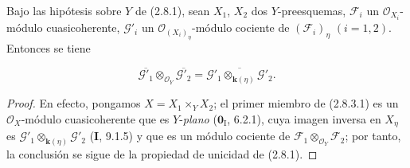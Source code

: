 \begin{proposition}[2.8.4]
\label{IV.2.8.4-fr}
Bajo las hipótesis sobre $Y$ de \textup{(2.8.1)}, sean $X_1$, $X_2$ dos
$Y$-preesquemas, $\mathcal F_i$ un $\mathcal O_{X_i}$-módulo
cuasicoherente, $\mathcal G'_i$ un $\mathcal O_{(X_i)_\eta}$-módulo cociente
de $(\mathcal F_i)_\eta$ $(i=1,2)$. Entonces se tiene
\end{proposition}

\begin{env}[2.8.4.1]
\label{IV.2.8.4.1-fr}
\[
\overline{\mathcal G'_1}\otimes_{\mathcal O_Y}\overline{\mathcal G'_2}
=\overline{\mathcal G'_1\otimes_{\mathbf{k}(\eta)}\mathcal G'_2}.
\]
\end{env}

\begin{proof}
En efecto, pongamos $X=X_1\times_Y X_2$; el primer miembro de (2.8.3.1) es
un $\mathcal O_X$-módulo cuasicoherente que es $Y$-\emph{plano}
($\mathbf{0}_{\mathrm I}$, 6.2.1), cuya imagen inversa en $X_\eta$ es
$\mathcal G'_1\otimes_{\mathbf{k}(\eta)}\mathcal G'_2$ (\textbf I, 9.1.5) y que es un módulo
cociente de $\mathcal F_1\otimes_{\mathcal O_Y}\mathcal F_2$; por tanto, la
conclusión se sigue de la propiedad de unicidad de (2.8.1).
\end{proof}

